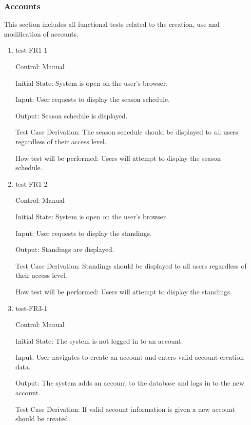 \documentclass[12pt, titlepage]{article}
\begin{document}
\subsubsection{Accounts}

This section includes all functional tests related to the creation, use and
modification of accounts.

\begin{enumerate}

  \item{test-FR1-1\\}

  Control: Manual

  Initial State: System is open on the user's browser.

  Input: User requests to display the season schedule.

  Output: Season schedule is displayed.

  Test Case Derivation: The season schedule should be displayed to all users
  regardless of their access level.

  How test will be performed: Users will attempt to display
  the season schedule.

  \item{test-FR1-2\\}

  Control: Manual

  Initial State: System is open on the user's browser.

  Input: User requests to display the standings.

  Output: Standings are displayed.

  Test Case Derivation: Standings should be displayed to all users
  regardless of their access level.

  How test will be performed: Users will attempt to display
  the standings.

  \item{test-FR3-1\\}

  Control: Manual

  Initial State: The system is not logged in to an account.

  Input: User navigates to create an account and enters valid account creation
  data.

  Output: The system adds an account to the database and logs in to the new
  account.

  Test Case Derivation: If valid account information is given a new account
  should be created.


\end{enumerate}
\end{document}
